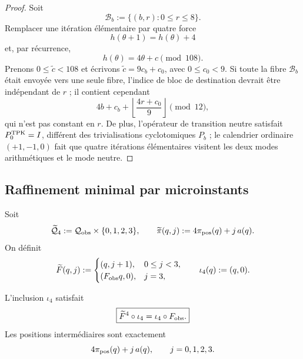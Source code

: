\begin{proof}
Soit
\[
 \mathcal B_b:=\{(b,r):0\leq r\leq8\}.
\]
Remplacer une itération élémentaire par quatre force
\[
 h(\theta+1)=h(\theta)+4
\]
et, par récurrence,
\[
 h(\theta)=4\theta+c\pmod{108}.
\]
Prenons \(0\leq\widetilde c<108\) et écrivons
\(\widetilde c=9c_b+c_0\), avec \(0\leq c_0<9\). Si toute la fibre
\(\mathcal B_b\) était envoyée vers une seule fibre, l’indice de bloc de
destination devrait être indépendant de \(r\) ; il contient cependant
\begin{equation}
 4b+c_b+
 \left\lfloor\frac{4r+c_0}{9}\right\rfloor
 \pmod{12},
 \label{p12-83-c1-s12:eq:u006c-bloque-obstruccion}
\end{equation}
qui n’est pas constant en \(r\). De plus, l’opérateur de transition neutre
satisfait \(P_0^{\rm TPK}=I\), différent des trivialisations
cyclotomiques \(P_b\) ; le calendrier ordinaire \((+1,-1,0)\) fait que
quatre itérations élémentaires visitent les deux modes arithmétiques et le mode
neutre.
\end{proof}

\subsection{Raffinement minimal par microinstants}

\begin{definition}
\label{p12-83-c1-s12:def:u006c-estado-subdividido}
Soit
\begin{equation}
 \widetilde{\mathcal Q}_4
 :=\mathcal Q_{\rm obs}\times\{0,1,2,3\},
 \qquad
 \widetilde\pi(q,j)
 :=4\pi_{\rm pos}(q)+j\,a(q).
 \label{p12-83-c1-s12:eq:u006c-estado-refinado}
\end{equation}
On définit
\begin{equation}
 \widetilde F(q,j):=
 \begin{cases}
  (q,j+1),&0\leq j<3,\\
  (F_{\rm obs}q,0),&j=3,
 \end{cases}
 \qquad
 \iota_4(q):=(q,0).
 \label{p12-83-c1-s12:eq:u006c-dinamica-refinada}
\end{equation}
\end{definition}

\begin{theorem}
\label{p12-83-c1-s12:thm:u006c-semiconjugacion}
L’inclusion \(\iota_4\) satisfait
\begin{equation}
 \boxed{
 \widetilde F^4\circ\iota_4
 =\iota_4\circ F_{\rm obs}.}
 \label{p12-83-c1-s12:eq:u006c-semiconjugacion}
\end{equation}
Les positions intermédiaires sont exactement
\[
 4\pi_{\rm pos}(q)+j\,a(q),
 \qquad j=0,1,2,3.
\]
\end{theorem}


